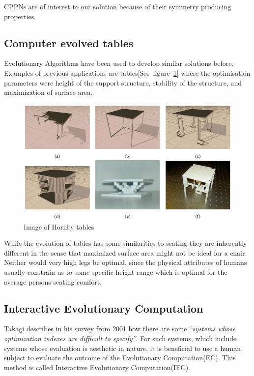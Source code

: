 CPPNs are of interest to our solution because of their symmetry producing properties.

\subsection{Computer evolved tables}
Evolutionary Algorithms have been used to develop similar solutions before. Examples of previous  applications are tables[See~figure~\ref{fig:hornby_tables}] where the optimisation parameters were height of the support structure, stability of the structure, and maximization of surface area.
\begin{figure}[ht]
\includegraphics[scale=.6]{content/img/tables}
\caption{Image of Hornby tables\cite{paper:ev4}}
\label{fig:hornby_tables}
\end{figure}

While the evolution of tables has some similarities to seating they are inherently
different in the sense that maximized surface area might not be ideal for a
chair.
Neither would very high legs be optimal, since the physical attributes of humans
usually constrain us to some specific height range which is optimal for the
average persons seating comfort.

\subsection{Interactive Evolutionary Computation}
Takagi describes in his survey from 2001\cite{Takagi2001} how there are some \emph{``systems whose optimization indexes are difficult to specify''}\cite[p.~1275]{Takagi2001}.
For such systems, which include systems whose evaluation is aesthetic in nature, it is beneficial to use a human subject to evaluate the outcome of the Evolutionary Computation(EC).
This method is called Interactive Evolutionary Computation(IEC).

